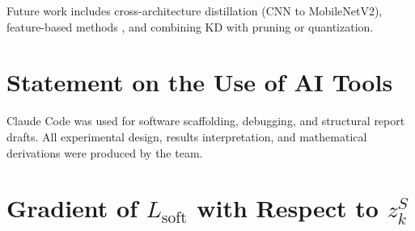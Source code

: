 \documentclass{article}
\theoremstyle{plain}
\theoremstyle{definition}
\theoremstyle{remark}
\begin{document}
Future work includes cross-architecture distillation (CNN to MobileNetV2), feature-based methods \citep{romero2015fitnets}, and combining KD with pruning or quantization.

\section*{Statement on the Use of AI Tools}
Claude Code was used for software scaffolding, debugging, and structural report drafts. All experimental design, results interpretation, and mathematical derivations were produced by the team.

\appendix
\section{Gradient of $L_{\mathrm{soft}}$ with Respect to $z_k^S$}
\label{app:tau2}
\end{document}
